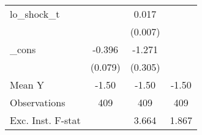{\begin{tabular}{l*{3}{c}}
\addlinespace
lo\_shock\_t  &                     &       0.017\sym{**} &                     \\
            &                     &     (0.007)         &                     \\
\addlinespace
\_cons      &      -0.396\sym{***}&      -1.271\sym{***}&                     \\
            &     (0.079)         &     (0.305)         &                     \\
\midrule
Mean Y      &       -1.50         &       -1.50         &       -1.50         \\
Observations&         409         &         409         &         409         \\
Exc. Inst. F-stat&                     &       3.664         &       1.867         \\
\bottomrule
\end{tabular}
}
